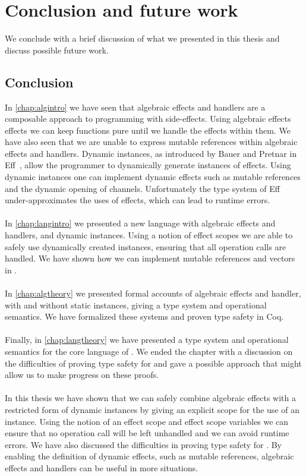 \chapter{\label{chap:conclusion}Conclusion and future work}

We conclude with a brief discussion of what we presented in this thesis and discuss possible future work.

\section{Conclusion}
In \cref{chap:algintro} we have seen that algebraic effects and handlers are a composable approach to programming with side-effects.
Using algebraic effects effects we can keep functions pure until we handle the effects within them.
We have also seen that we are unable to express mutable references within algebraic effects and handlers.
Dynamic instances, as introduced by Bauer and Pretnar in Eff~\autocite{eff1}, allow the programmer to dynamically generate instances of effects.
Using dynamic instances one can implement dynamic effects such as mutable references and the dynamic opening of channels.
Unfortunately the type system of Eff under-approximates the uses of effects, which can lead to runtime errors.
\\\\
In \cref{chap:langintro} we presented a new language \lang{} with algebraic effects and handlers, and dynamic instances.
Using a notion of effect scopes we are able to safely use dynamically created instances, ensuring that all operation calls are handled.
We have shown how we can implement mutable references and vectors in \lang{}.
\\\\
In \cref{chap:algtheory} we presented formal accounts of algebraic effects and handler, with and without static instances, giving a type system and operational semantics.
We have formalized these systems and proven type safety in Coq.
\\\\
Finally, in \cref{chap:langtheory} we have presented a type system and operational semantics for the core language of \lang{}.
We ended the chapter with a discussion on the difficulties of proving type safety for \lang{} and gave a possible approach that might allow us to make progress on these proofs.
\\\\
In this thesis we have shown that we can safely combine algebraic effects with a restricted form of dynamic instances by giving an explicit scope for the use of an instance.
Using the notion of an effect scope and effect scope variables we can ensure that no operation call will be left unhandled and we can avoid runtime errors.
We have also discussed the difficulties in proving type safety for \lang{}.
By enabling the definition of dynamic effects, such as mutable references, algebraic effects and handlers can be useful in more situations.
 
